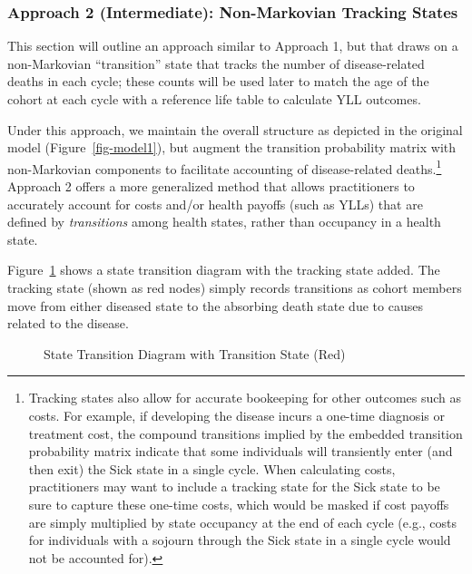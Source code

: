 \documentclass[
]{agujournal2019}
\begin{document}
\subsubsection{Approach 2 (Intermediate): Non-Markovian Tracking
States}\label{approach-2-intermediate-non-markovian-tracking-states}

This section will outline an approach similar to Approach 1, but that
draws on a non-Markovian ``transition'' state that tracks the number of
disease-related deaths in each cycle; these counts will be used later to
match the age of the cohort at each cycle with a reference life table to
calculate YLL outcomes.

Under this approach, we maintain the overall structure as depicted in
the original model (Figure~\ref{fig-model1}), but augment the transition
probability matrix with non-Markovian components to facilitate
accounting of disease-related deaths.\footnote{Tracking states also
  allow for accurate bookeeping for other outcomes such as costs. For
  example, if developing the disease incurs a one-time diagnosis or
  treatment cost, the compound transitions implied by the embedded
  transition probability matrix indicate that some individuals will
  transiently enter (and then exit) the Sick state in a single cycle.
  When calculating costs, practitioners may want to include a tracking
  state for the Sick state to be sure to capture these one-time costs,
  which would be masked if cost payoffs are simply multiplied by state
  occupancy at the end of each cycle (e.g., costs for individuals with a
  sojourn through the Sick state in a single cycle would not be
  accounted for).} Approach 2 offers a more generalized method that
allows practitioners to accurately account for costs and/or health
payoffs (such as YLLs) that are defined by \emph{transitions} among
health states, rather than occupancy in a health state.

Figure~\ref{fig-transition} shows a state transition diagram with the
tracking state added. The tracking state (shown as red nodes) simply
records transitions as cohort members move from either diseased state to
the absorbing death state due to causes related to the disease.

\begin{figure}


\caption{\label{fig-transition}State Transition Diagram with Transition
State (Red)}

\end{figure}%
\end{document}
